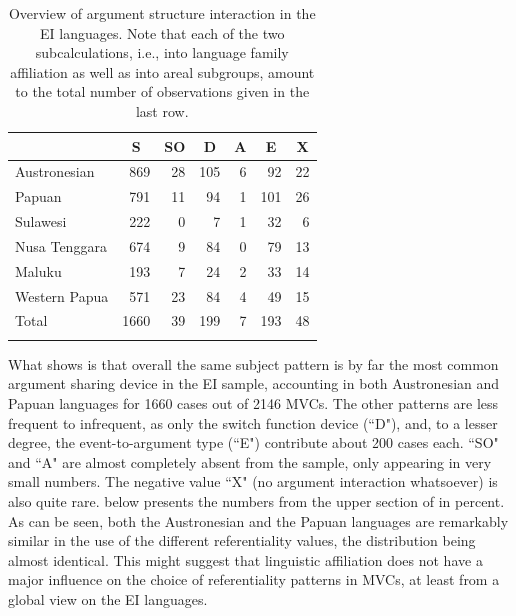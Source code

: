 \begin{table}
\begin{tabular}{lrrrrrr}
  \lsptoprule
 & \multicolumn{1}{c}{S} & \multicolumn{1}{c}{SO} & \multicolumn{1}{c}{D} & \multicolumn{1}{c}{A} & \multicolumn{1}{c}{E} & \multicolumn{1}{c}{X} \tabularnewline 
  \midrule
  Austronesian & 869 &  28 & 105 &   6 &  92 &  22 \tabularnewline
  Papuan & 791 &  11 & 94 &   1 &  101 &  26 \tabularnewline
  \midrule
  Sulawesi & 222 &   0 &  7 &   1 &  32 &   6 \tabularnewline
  Nusa Tenggara & 674 &  9 &  84 &   0 &  79 &  13 \tabularnewline 
  Maluku & 193 &   7 &  24 &   2 &   33 &  14 \tabularnewline
  Western Papua & 571 &  23 & 84 &   4 &  49 &  15 \tabularnewline 
 \midrule
 Total & 1660  & 39 & 199 &  7 & 193 &  48 \tabularnewline
   \lspbottomrule
\end{tabular}
\caption[Argument structure interaction in the EI sample]{Overview of argument structure interaction in the EI languages. Note that each of the two subcalculations, i.e., into language family affiliation as well as into areal subgroups, amount to the total number of observations given in the last row.}
\label{table:Referentiality_overview}
\end{table}

What  shows is that overall the same subject pattern is by far the most common argument sharing device in the EI sample, accounting in both Austronesian and Papuan languages for 1660 cases out of 2146 MVCs. The other patterns are less frequent to infrequent, as only the switch function device (``D"), and, to a lesser degree, the event-to-argument type (``E") contribute about 200 cases each. ``SO" and ``A" are almost completely absent from the sample, only appearing in very small numbers. The negative value ``X" (no argument interaction whatsoever) is also quite rare.  below presents the numbers from the upper section of  in percent. As can be seen, both the Austronesian and the Papuan languages are remarkably similar in the use of the different referentiality values, the distribution being almost identical. This might suggest that linguistic affiliation does not have a major influence on the choice of referentiality patterns in MVCs, at least from a global view on the EI languages.

